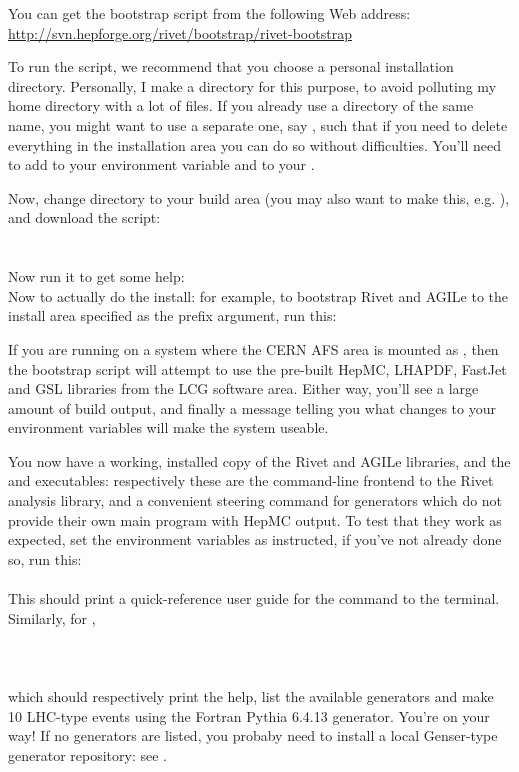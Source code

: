 \documentclass{JHEP3}
\begin{document}
You can get the bootstrap script from the following Web address:
\url{http://svn.hepforge.org/rivet/bootstrap/rivet-bootstrap}

To run the script, we recommend that you choose a personal installation
directory. Personally, I make a  directory for this purpose, to
avoid polluting my home directory with a lot of files. If you already use a
directory of the same name, you might want to use a separate one, say
, such that if you need to delete everything in the
installation area you can do so without difficulties. You'll need to add
 to your  environment variable and
 to your .

Now, change directory to your build area (you may also want to make this,
e.g. ), and download the script:\\
\\
\\
Now run it to get some help:
\\
Now to actually do the install: for example, to bootstrap Rivet and AGILe 
to the install area specified as the prefix argument, run this:\\

If you are running on a system where the CERN AFS area is mounted as
, then the bootstrap script will attempt to use the pre-built
HepMC, LHAPDF, FastJet and GSL libraries from the LCG software area. Either way,
you'll see a large amount of build output, and finally a message telling you
what changes to your environment variables will make the system useable. 

You now have a working, installed copy of the Rivet and AGILe libraries, and the
 and  executables: respectively these are the
command-line frontend to the Rivet analysis library, and a convenient steering
command for generators which do not provide their own main program with HepMC
output. To test that they work as expected, set the environment variables as
instructed, if you've not already done so, run this:\\
\\
%
This should print a quick-reference user guide for the  command to
the terminal. Similarly, for ,\\
\\
\\
\\
which should respectively print the help, list the available generators and make
10 LHC-type events using the Fortran Pythia 6.4.13 generator. You're on your
way! If no generators are listed, you probaby need to install a local
Genser-type generator repository: see .
\end{document}
